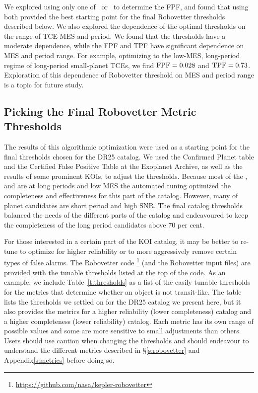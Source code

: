 We explored using only one of \scrtce\ or \invtce\ to determine the FPF, and found that using both provided the best starting point for the final Robovetter thresholds described below.  We also explored the dependence of the optimal thresholds on the range of TCE MES and period.  We found that the thresholds have a moderate dependence, while the FPF and TPF have significant dependence on MES and period range.  For example, optimizing to the low-MES, long-period regime of long-period small-planet TCEs,  we find ${\rm FPF} = 0.028$ and ${\rm TPF} = 0.73$.  Exploration of this dependence of Robovetter threshold on MES and period range is a topic for future study.

\subsection{Picking the Final Robovetter Metric Thresholds}

The results of this algorithmic optimization were used as a starting point for the final thresholds chosen for the DR25 catalog. We used the Confirmed Planet table and the Certified False Positive Table at the Exoplanet Archive, as well as the results of some prominent KOIs,  to adjust the thresholds.  Because most of the ,  and  are at long periods and low MES the automated tuning optimized the completeness and effectiveness for this part of the catalog. However, many of  planet candidates are short period and high SNR. The final catalog thresholds balanced the needs of the different parts of the catalog and endeavoured to keep the completeness of the long period candidates above 70 per cent.

For those interested in a certain part of the KOI catalog, it may be better to re-tune to optimize for higher reliability or to more aggressively remove certain types of false alarms.   The Robovetter code \footnote{\url{https://github.com/nasa/kepler-robovetter}} (and the Robovetter input files) are provided with the tunable thresholds listed at the top of the code.  As an example, we include Table~\ref{t:thresholds} as a list of the easily tunable thresholds for the metrics that determine whether an object is not transit-like.  The table lists the thresholds we settled on for the DR25 catalog we present here, but it also provides the metrics for a higher reliability (lower completeness) catalog and a higher completeness (lower reliability) catalog. Each metric has its own range of possible values and some are more sensitive to small adjustments than others.  Users should use caution when changing the thresholds and should endeavour to understand the different metrics described in \S\ref{s:robovetter} and Appendix\ref{s:metrics} before doing so.




